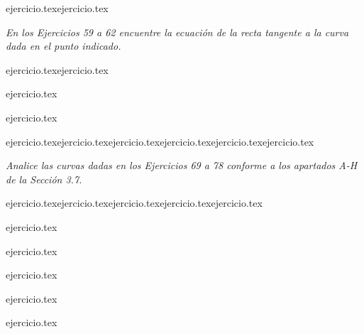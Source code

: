 \vspace{1em}
\begin{enumerate}
    \setcounter{enumi}{56}
    {ejercicio.tex}{ejercicio.tex}\end{enumerate}

\vspace{1em}
\noindent \textit{En los Ejercicios 59 a 62 encuentre la ecuación de la recta tangente a la curva dada en el punto indicado.}

\begin{enumerate}
    \setcounter{enumi}{58}
    \begin{minipage}{0.45\textwidth}
    {ejercicio.tex}{ejercicio.tex}\end{minipage}%
    \begin{minipage}{0.45\textwidth}
    \setcounter{enumi}{59}
    {ejercicio.tex}\addtocounter{enumi}{1}
    {ejercicio.tex}\end{minipage}
\end{enumerate}

\vspace{1em}
\begin{enumerate}
    \setcounter{enumi}{62}
    {ejercicio.tex}{ejercicio.tex}{ejercicio.tex}{ejercicio.tex}{ejercicio.tex}{ejercicio.tex}\end{enumerate}

\vspace{1em}
\noindent \textit{Analice las curvas dadas en los Ejercicios 69 a 78 conforme a los apartados A-H de la Sección 3.7.}

\begin{enumerate}
    \setcounter{enumi}{68}
    \begin{minipage}{0.45\textwidth}
    {ejercicio.tex}{ejercicio.tex}{ejercicio.tex}{ejercicio.tex}{ejercicio.tex}\end{minipage}%
    \begin{minipage}{0.45\textwidth}
    \setcounter{enumi}{69}
    {ejercicio.tex}\addtocounter{enumi}{1}
    {ejercicio.tex}\addtocounter{enumi}{1}
    {ejercicio.tex}\addtocounter{enumi}{1}
    {ejercicio.tex}\addtocounter{enumi}{1}
    {ejercicio.tex}\end{minipage}
\end{enumerate}

